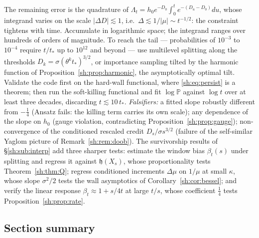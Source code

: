 \documentclass[11pt]{article}
\numberwithin{equation}{section}
\theoremstyle{plain}
\theoremstyle{definition}
\theoremstyle{remark}
\newcommand{\PP}{\mathbb{P}}
\newcommand{\hm}{\mathfrak{h}}
\begin{document}
The remaining error is the quadrature of
$\Lambda_t=h_0e^{-D_0}\int_0^te^{-(D_u-D_0)}du$, whose integrand varies on
the scale $|\Delta D|\lesssim1$, i.e.\ $\Delta\lesssim1/|\mu|\sim
t^{-1/2}$: the constraint tightens with time. Accumulate in logarithmic
space; the integrand ranges over hundreds of orders of magnitude. To reach
the tail --- probabilities of $10^{-3}$ to $10^{-4}$ require
$t/t_*$ up to $10^{12}$ and beyond --- use multilevel splitting along the
thresholds $D_k=\sigma(\theta^kt_*)^{3/2}$, or importance sampling tilted
by the harmonic function of Proposition~\ref{sh:prop:harmonic}, the
asymptotically optimal tilt. Validate the code first on the hard-wall
functional, where \eqref{sh:eq:persist} is a theorem; then run the
soft-killing functional and fit $\log\PP$ against $\log t$ over at least
three decades, discarding $t\lesssim10\,t_*$.
\emph{Falsifiers:} a fitted slope robustly different from $-\tfrac14$
(Ansatz fails: the killing term carries its own scale); any dependence of
the slope on $h_0$ (gauge violation, contradicting
Proposition~\ref{sh:prop:gauge}); non-convergence of the conditioned
rescaled credit $D_s/\sigma s^{3/2}$ (failure of the self-similar Yaglom
picture of Remark~\ref{sh:rem:doob}). The survivorship results of
\S\ref{sh:sub:interp} add three sharper tests: estimate the window bias
$\beta_t(s)$ under splitting and regress it against $\hm(X_s)$, whose
proportionality tests Theorem~\ref{sh:thm:Q}; regress conditioned
increments $\Delta\mu$ on $1/\mu$ at small $\kappa$, whose slope
$\sigma^2/2$ tests the wall asymptotics of
Corollary~\ref{sh:cor:bessel}; and verify the linear response
$\beta_t\approx1+s/4t$ at large $t/s$, whose coefficient $\tfrac14$ tests
Proposition~\ref{sh:prop:rate}.

\subsection*{Section summary}
\end{document}
